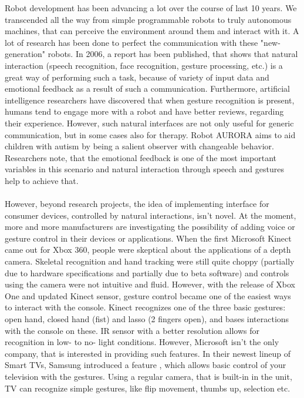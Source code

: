 \documentclass[a4paper,11pt,oneside]{article}
\begin{document}
  Robot development has been advancing a lot over the course of last 10 years. We transcended all the way from simple programmable robots to truly autonomous machines, that can perceive the environment around them and interact with it. A lot of research has been done to perfect the communication with these "new-generation" robots. In 2006, a report \cite{SA01} has been published, that shows that natural interaction (speech recognition, face recognition, gesture processing, etc.) is a great way of performing such a task, because of variety of input data and emotional feedback as a result of such a communication. Furthermore, artificial intelligence researchers \cite{SA02} have discovered that when gesture recognition is present, humans tend to engage more with a robot and have better reviews, regarding their experience. However, such natural interfaces are not only useful for generic communication, but in some cases also for therapy. Robot AURORA \cite{SA03} aims to aid children with autism by being a salient observer with changeable behavior. Researchers note, that the emotional feedback is one of the most important variables in this scenario and natural interaction through speech and gestures help to achieve that.\\
  \\
  However, beyond research projects, the idea of implementing interface for consumer devices, controlled by natural interactions, isn't novel. At the moment, more and more manufacturers are investigating the possibility of adding voice or gesture control in their devices or applications. When the first Microsoft Kinect came out for Xbox 360, people were skeptical about the applications of a depth camera. Skeletal recognition and hand tracking were still quite choppy (partially due to hardware specifications and partially due to beta software) and controls using the camera were not intuitive and fluid. However, with the release of Xbox One and updated Kinect sensor, gesture control became one of the easiest ways to interact with the console. Kinect recognizes one of the three basic gestures: open hand, closed hand (fist) and lasso (2 fingers open), and bases interactions with the console on these. IR sensor with a better resolution allows for recognition in low- to no- light conditions. However, Microsoft isn't the only company, that is interested in providing such features. In their newest lineup of Smart TVs, Samsung introduced a feature \cite{SM01}, which allows basic control of your television with the gestures. Using a regular camera, that is built-in in the unit, TV can recognize simple gestures, like flip movement, thumbs up, selection etc. \\
\end{document}
